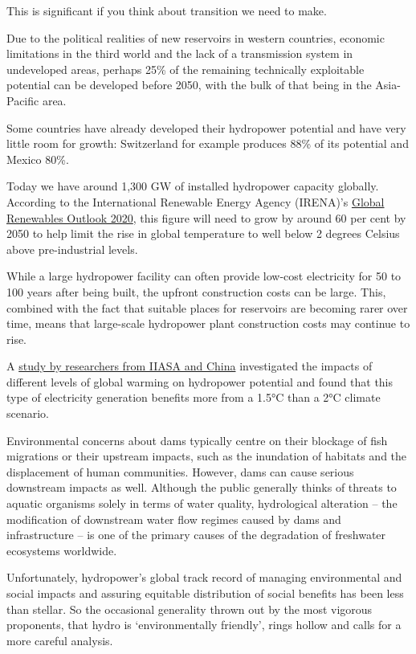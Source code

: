 \documentclass[
]{book}
\begin{document}
This is significant if you think about transition we need to make.

Due to the political realities of new reservoirs in western countries, economic limitations in the third world and the lack of a transmission system in undeveloped areas, perhaps 25\% of the remaining technically exploitable potential can be developed before 2050, with the bulk of that being in the Asia-Pacific area.

Some countries have already developed their hydropower potential and have very little room for growth: Switzerland for example produces 88\% of its potential and Mexico 80\%.

Today we have around 1,300 GW of installed hydropower capacity globally. According to the International Renewable Energy Agency (IRENA)'s \href{https://www.irena.org/-/media/Files/IRENA/Agency/Publication/2020/Apr/IRENA_Global_Renewables_Outlook_2020.pdf}{Global Renewables Outlook 2020}, this figure will need to grow by around 60 per cent by 2050 to help limit the rise in global temperature to well below 2 degrees Celsius above pre-industrial levels.

While a large hydropower facility can often provide low-cost electricity for 50 to 100 years after being built, the upfront construction costs can be large. This, combined with the fact that suitable places for reservoirs are becoming rarer over time, means that large-scale hydropower plant construction costs may continue to rise.

A \href{https://phys.org/news/2020-05-exploring-impacts-climate-hydropower-production.html}{study by researchers from IIASA and China} investigated the impacts of different levels of global warming on hydropower potential and found that this type of electricity generation benefits more from a 1.5°C than a 2°C climate scenario.

Environmental concerns about dams typically centre on their blockage of fish migrations or their upstream impacts, such as the inundation of habitats and the displacement of human communities. However, dams can cause serious downstream impacts as well. Although the public generally thinks of threats to aquatic organisms solely in terms of water quality, hydrological alteration -- the modification of downstream water flow regimes caused by dams and infrastructure -- is one of the primary causes of the degradation of freshwater ecosystems worldwide.

Unfortunately, hydropower's global track record of managing environmental and social impacts and assuring equitable distribution of social benefits has been less than stellar. So the occasional generality thrown out by the most vigorous proponents, that hydro is `environmentally friendly', rings hollow and calls for a more careful analysis.
\end{document}
